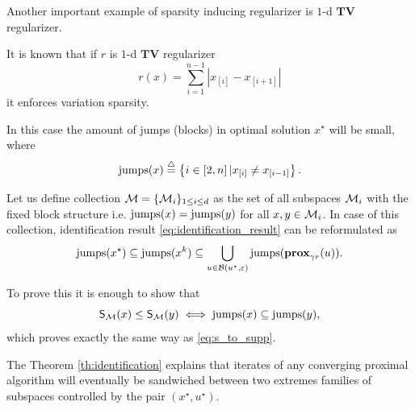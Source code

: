 Another important example of sparsity inducing regularizer is $1$-d $\mathbf{TV}$ regularizer.
\begin{example}\label{ex:intro_jump_strata}
It is known that if $r$ is $1$-d $\mathbf{TV}$ regularizer
\begin{equation}\label{eq:tvreg}
    r(x) = \sum\limits_{i=1}^{n-1}|x_{[i]} - x_{[i+1]}|
\end{equation}
it enforces variation sparsity.    

In this case the amount of jumps (blocks) in optimal solution $x^\star$ will be small, where
\begin{equation}
\mathrm{jumps}(x)\stackrel{\triangle}{=} \left\{i\in [2,n]\,| x_{[i]} \neq x_{[i-1]} \right\}.    
\end{equation}

Let us define collection $\mathcal{M} = \{\mathcal{M}_i\}_{1\leq i\leq d}$ as the set of all subspaces $\mathcal{M}_i$ with the fixed block structure i.e. $\mathrm{jumps}(x) = \mathrm{jumps}(y)$ for all $x,y\in \mathcal{M}_i$. In case of this collection, identification result \eqref{eq:identification_result} can be reformulated as
\begin{equation}\label{eq:ident_tv}
    \mathrm{jumps}(x^\star) \subseteq \mathrm{jumps}(x^k) \subseteq \bigcup_{u\in\mathcal{B}(u^\star,\varepsilon)} \mathrm{jumps}(\mathbf{prox}_{\gamma r}(u)).
\end{equation}

To prove this it is enough to show that
\begin{equation}\label{eq:s_to_jumps}
    \mathsf{S}_{\mathcal{M}}(x)\leq\mathsf{S}_{\mathcal{M}}(y) \iff \mathrm{jumps}(x)\subseteq\mathrm{jumps}(y),
\end{equation}
which proves exactly the same way as \eqref{eq:s_to_supp}.

\end{example}


The Theorem \ref{th:identification} explains that iterates of any converging proximal algorithm will eventually be sandwiched between two extremes families of subspaces controlled by the pair $(x^\star, u^\star)$.